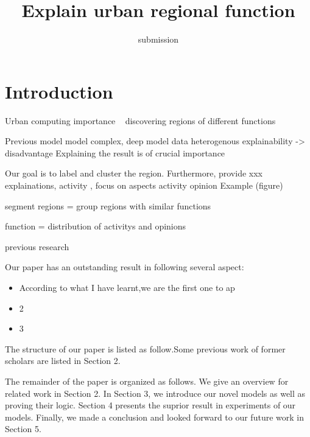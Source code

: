 \documentclass{llncs}
\begin{document}
\title{Explain urban regional function}
\author{submission }
\maketitle
\section{Introduction}


Urban computing importance ~\cite{1}
discovering regions of different functions~\cite{3} %

Previous model %
model complex, deep model
data heterogenous 
explainability -> disadvantage 
Explaining the result is of crucial importance


Our goal is to label and cluster the region.
Furthermore, provide xxx explainations, activity , focus on aspects
activity
opinion
Example (figure)



segment regions = group regions with similar functions

function = distribution of activitys and opinions


previous research









Our paper has an outstanding result in following several aspect:
\begin{itemize}
  \item According to what I have learnt,we are the first one to ap
  \item 2
  \item 3
\end{itemize}



The structure of our paper is listed as follow.Some previous work of former scholars are listed in Section 2.



The remainder of the paper is organized as follows. 
We give an overview for related work in Section 2.
In Section 3, we introduce our novel models as well as proving their logic.
Section 4 presents the suprior result in experiments of our models.
Finally, we made a conclusion and looked forward to our future work in Section 5.
\end{document}
